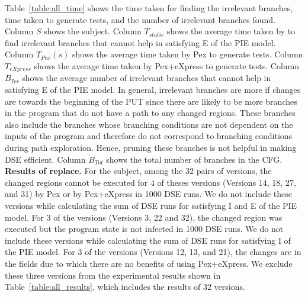 Table~\ref{table:all_time} shows the time taken for finding the irrelevant branches, time taken to generate tests, and the number of irrelevant branches found. Column $S$ shows the subject. Column $T_{static}$ shows the average time taken by  to find irrelevant branches that cannot help in satisfying E of the PIE model. Column $T_{Pex}(s)$ shows the average time taken by Pex to generate tests. Column $T_{eXpress}$ shows the average time taken by Pex+eXpress to generate tests. Column $B_{Irr}$ shows the average number of irrelevant branches that cannot help in satisfying E of the PIE model. In general, irrelevant branches are more if changes are towards the beginning of the PUT since there are likely to be more branches in the program that do not have a path to any changed regions. These branches also include the branches whose branching conditions are not dependent on the inputs of the program and therefore do not correspond to branching conditions during path exploration. Hence, pruning these branches is not helpful in making DSE efficient. Column $B_{Tot}$ shows the total number of branches in the CFG.
\\ \textbf{Results of replace. }For the  subject, among the 32 pairs of versions, the changed regions cannot be executed for 4 of theses versions (Versions 14, 18, 27, and 31) by Pex or by Pex+eXpress in 1000 DSE runs. We do not include these versions while calculating the sum of DSE runs for satisfying I and E of the PIE model. For 3 of the versions (Versions 3, 22 and 32), the changed region was executed but the program state is not infected in 1000 DSE runs. We do not include these versions while calculating the sum of DSE runs for satisfying I of the PIE model. For 3 of the versions (Versions 12, 13, and 21), the changes are in the fields due to which there are no benefits of using Pex+eXpress. We exclude these three versions from the experimental results shown in Table~\ref{table:all_results}, which includes the results of 32 versions. 

